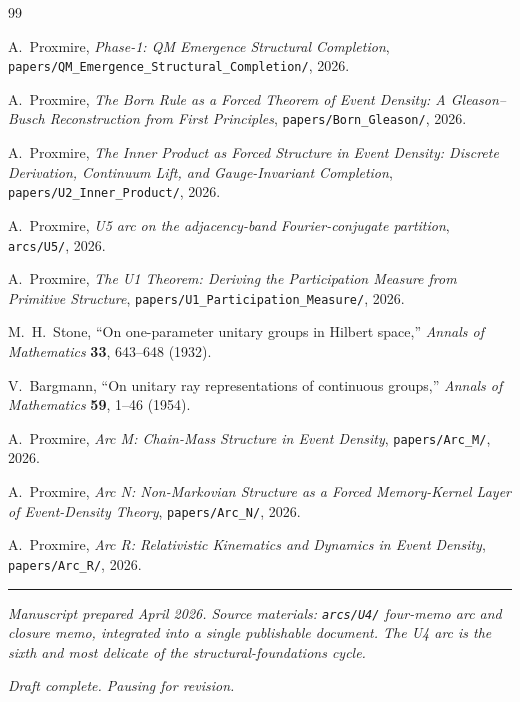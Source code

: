 \documentclass[11pt,a4paper]{article}
\begin{document}
\begin{thebibliography}{99}

A.~Proxmire, \emph{Phase-1: QM Emergence Structural Completion}, \texttt{papers/QM\_Emergence\_Structural\_Completion/}, 2026.

A.~Proxmire, \emph{The Born Rule as a Forced Theorem of Event Density: A Gleason--Busch Reconstruction from First Principles}, \texttt{papers/Born\_Gleason/}, 2026.

A.~Proxmire, \emph{The Inner Product as Forced Structure in Event Density: Discrete Derivation, Continuum Lift, and Gauge-Invariant Completion}, \texttt{papers/U2\_Inner\_Product/}, 2026.

A.~Proxmire, \emph{U5 arc on the adjacency-band Fourier-conjugate partition}, \texttt{arcs/U5/}, 2026.

A.~Proxmire, \emph{The U1 Theorem: Deriving the Participation Measure from Primitive Structure}, \texttt{papers/U1\_Participation\_Measure/}, 2026.

M.~H.~Stone, ``On one-parameter unitary groups in Hilbert space,'' \emph{Annals of Mathematics} \textbf{33}, 643--648 (1932).

V.~Bargmann, ``On unitary ray representations of continuous groups,'' \emph{Annals of Mathematics} \textbf{59}, 1--46 (1954).

A.~Proxmire, \emph{Arc M: Chain-Mass Structure in Event Density}, \texttt{papers/Arc\_M/}, 2026.

A.~Proxmire, \emph{Arc N: Non-Markovian Structure as a Forced Memory-Kernel Layer of Event-Density Theory}, \texttt{papers/Arc\_N/}, 2026.

A.~Proxmire, \emph{Arc R: Relativistic Kinematics and Dynamics in Event Density}, \texttt{papers/Arc\_R/}, 2026.

\end{thebibliography}

\vspace{1em}
\noindent\rule{\linewidth}{0.4pt}
\vspace{0.2em}

\noindent\emph{Manuscript prepared April 2026. Source materials: \texttt{arcs/U4/} four-memo arc and closure memo, integrated into a single publishable document. The U4 arc is the sixth and most delicate of the structural-foundations cycle.}

\noindent\emph{Draft complete. Pausing for revision.}
\end{document}
